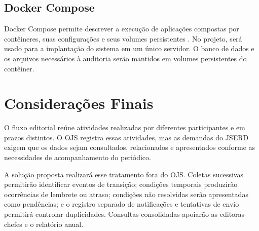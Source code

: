 \subsection{Docker Compose}

Docker Compose permite descrever a execução de aplicações compostas por contêineres, suas configurações e seus volumes persistentes \cite{dockercompose}. No projeto, será usado para a implantação do sistema em um único servidor. O banco de dados e os arquivos necessários à auditoria serão mantidos em volumes persistentes do contêiner.

\section{Considerações Finais}
\label{sec-fundteo-conclusao}

O fluxo editorial reúne atividades realizadas por diferentes participantes e em prazos distintos. O OJS registra essas atividades, mas as demandas do JSERD exigem que os dados sejam consultados, relacionados e apresentados conforme as necessidades de acompanhamento do periódico.

A solução proposta realizará esse tratamento fora do OJS. Coletas sucessivas permitirão identificar eventos de transição; condições temporais produzirão ocorrências de lembrete ou atraso; condições não resolvidas serão apresentadas como pendências; e o registro separado de notificações e tentativas de envio permitirá controlar duplicidades. Consultas consolidadas apoiarão as editoras-chefes e o relatório anual.
